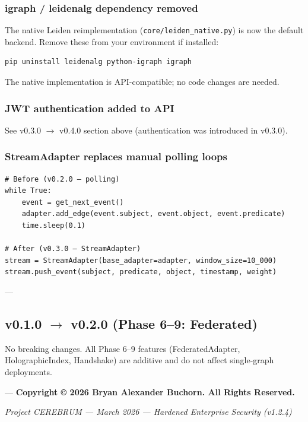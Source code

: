 \documentclass[11pt,article,oneside]{memoir}
\begin{document}
\subsubsection{igraph / leidenalg dependency removed}
The native Leiden reimp\-lementation (\texttt{core/leiden\_native.py}) is now the default backend. Remove these from your environment if installed:

\begin{lstlisting}
pip uninstall leidenalg python-igraph igraph
\end{lstlisting}

The native imple\-mentation is API-compatible; no code changes are needed.

\subsubsection{JWT authe\-ntication added to API}
See v0.3.0 $\to$ v0.4.0 section above (authe\-ntication was introduced in v0.3.0).

\subsubsection{StreamAdapter replaces manual polling loops}
\begin{lstlisting}
# Before (v0.2.0 — polling)
while True:
    event = get_next_event()
    adapter.add_edge(event.subject, event.object, event.predicate)
    time.sleep(0.1)

# After (v0.3.0 — StreamAdapter)
stream = StreamAdapter(base_adapter=adapter, window_size=10_000)
stream.push_event(subject, predicate, object, timestamp, weight)
\end{lstlisting}

---

\subsection{v0.1.0 $\to$ v0.2.0 (Phase 6–9: Federated)}

No breaking changes. All Phase 6–9 features (FederatedAdapter, Hologr\-aphicIndex, Handshake) are additive and do not affect single-graph deployments.

---
\textbf{Copyright © 2026 Bryan Alexander Buchorn. All Rights Reserved.}


\vspace{3em}
\begin{center}
    \small \textit{Project CEREBRUM — March 2026 — Hardened Enterprise Security (v1.2.4)}
\end{center}
\end{document}
